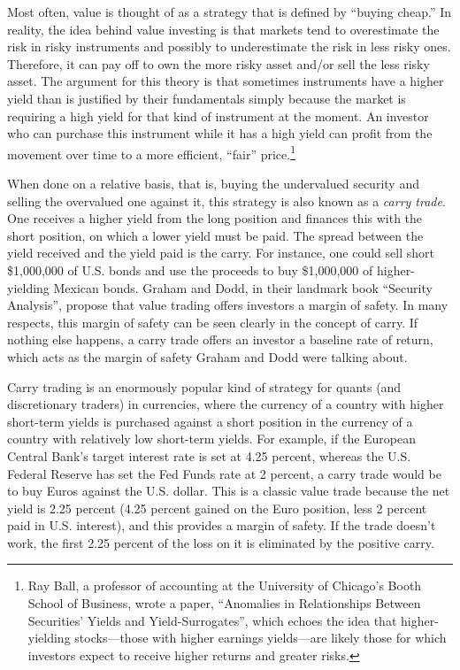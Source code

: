 \documentclass[11pt]{report}
\begin{document}
					Most often, value is thought of as a strategy that is defined by ``buying cheap.'' In reality, the idea behind value investing is that markets tend to overestimate the risk in risky instruments and possibly to underestimate the risk in less risky ones. Therefore, it can pay off to own the more risky asset and/or sell the less risky asset. The argument for this theory is that sometimes instruments have a higher yield than is justified by their fundamentals simply because the market is requiring a high yield for that kind of instrument at the moment. An investor who can purchase this instrument while it has a high yield can profit from the movement over time to a more efficient, ``fair'' price.\footnote{Ray Ball, a professor of accounting at the University of Chicago's Booth School of Business, wrote a paper, ``Anomalies in Relationships Between Securities' Yields and Yield-Surrogates'', which echoes the idea that higher-yielding stocks—those with higher earnings yields—are likely those for which investors expect to receive higher returns and greater risks.}

					When done on a relative basis, that is, buying the undervalued security and selling the overvalued one against it, this strategy is also known as a \textit{carry trade}. One receives a higher yield from the long position and finances this with the short position, on which a lower yield must be paid. The spread between the yield received and the yield paid is the carry. For instance, one could sell short \$1,000,000 of U.S. bonds and use the proceeds to buy \$1,000,000 of higher-yielding Mexican bonds. Graham and Dodd, in their landmark book ``Security Analysis'', propose that value trading offers investors a margin of safety. In many respects, this margin of safety can be seen clearly in the concept of carry. If nothing else happens, a carry trade offers an investor a baseline rate of return, which acts as the margin of safety Graham and Dodd were talking about.

					Carry trading is an enormously popular kind of strategy for quants (and discretionary traders) in currencies, where the currency of a country with higher short-term yields is purchased against a short position in the currency of a country with relatively low short-term yields. For example, if the European Central Bank's target interest rate is set at 4.25 percent, whereas the U.S. Federal Reserve has set the Fed Funds rate at 2 percent, a carry trade would be to buy Euros against the U.S. dollar. This is a classic value trade because the net yield is 2.25 percent (4.25 percent gained on the Euro position, less 2 percent paid in U.S. interest), and this provides a margin of safety. If the trade doesn't work, the first 2.25 percent of the loss on it is eliminated by the positive carry.
\end{document}
